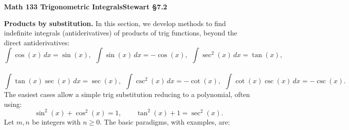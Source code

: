 \documentclass[11pt]{article}
\newcommand{\ts}{\textstyle}
\begin{document}
\centerline{\bf Math 133\hspace{1.5em} \hfill{\Large\bf
Trigonometric Integrals}\hfill Stewart \S7.2}
\vspace{1em}

\noindent 
{\bf Products by substitution.} In this section, we develop methods
to find indefinite integrals (antiderivatives) of products of trig functions, beyond the
direct antiderivatives:
$$\ts
\int \cos(x)\,dx = \sin(x), \ \ 
\int \sin(x)\,dx = -\cos(x), \ \ 
\int \sec^2(x)\,dx = \tan(x), 
$$
\\[-2.4em]
$$\ts
\int \tan(x)\sec(x)\,dx = \sec(x),\ \ 
\int \csc^2(x)\,dx = -\cot(x), \ \ 
\int \cot(x)\csc(x)\,dx = -\csc(x).
$$ 
The easiest cases allow a simple trig substitution reducing to a polynomial, 
often using:
$$\sin^2(x)+\cos^2(x)=1, \qquad \tan^2(x)+1=\sec^2(x).$$
Let $m,n$ be integers with $n\geq 0$. The basic paradigms, with examples, are:
\end{document}
